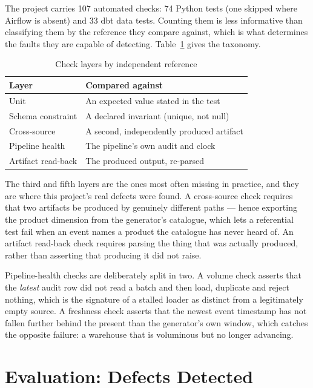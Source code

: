 \documentclass[conference]{IEEEtran}
\begin{document}
The project carries 107 automated checks: 74 Python tests (one skipped where
Airflow is absent) and 33 dbt data tests. Counting them is less informative
than classifying them by the reference they compare against, which is what
determines the faults they are capable of detecting.
Table~\ref{tab:layers} gives the taxonomy.

\begin{table}[t]
\caption{Check layers by independent reference}
\label{tab:layers}
\centering
\begin{tabular}{|l|l|}
\hline
\textbf{Layer} & \textbf{Compared against} \\
\hline
Unit & An expected value stated in the test \\
Schema constraint & A declared invariant (unique, not null) \\
Cross-source & A second, independently produced artifact \\
Pipeline health & The pipeline's own audit and clock \\
Artifact read-back & The produced output, re-parsed \\
\hline
\end{tabular}
\end{table}

The third and fifth layers are the ones most often missing in practice, and
they are where this project's real defects were found. A cross-source check
requires that two artifacts be produced by genuinely different paths --- hence
exporting the product dimension from the generator's catalogue, which lets a
referential test fail when an event names a product the catalogue has never
heard of. An artifact read-back check requires parsing the thing that was
actually produced, rather than asserting that producing it did not raise.

Pipeline-health checks are deliberately split in two. A volume check asserts
that the \emph{latest} audit row did not read a batch and then load, duplicate
and reject nothing, which is the signature of a stalled loader as distinct from
a legitimately empty source. A freshness check asserts that the newest event
timestamp has not fallen further behind the present than the generator's own
window, which catches the opposite failure: a warehouse that is voluminous but
no longer advancing.

\section{Evaluation: Defects Detected}
\label{sec:eval}
\end{document}
